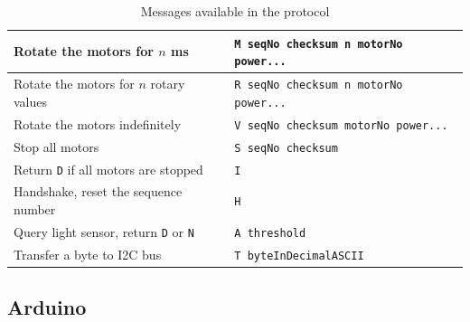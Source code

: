\documentclass[a4paper,12pt]{article}
\begin{document}
\begin{table}[h!]
\centering
\begin{tabular}{ | l | l | }
    \hline
    Rotate the motors for $n$ ms &
    \small{\texttt{M seqNo checksum n motorNo power...}} \\ \hline
    Rotate the motors for $n$ rotary values &
    \small{\texttt{R seqNo checksum n motorNo power...}} \\ \hline
    Rotate the motors indefinitely &
    \small{\texttt{V seqNo checksum motorNo power...}} \\ \hline
    Stop all motors &
    \small{\texttt{S seqNo checksum}} \\ \hline
    Return \texttt{D} if all motors are stopped &
    \small{\texttt{I}} \\ \hline
    Handshake, reset the sequence number &
    \small{\texttt{H}} \\ \hline
    Query light sensor, return \texttt{D} or \texttt{N} &
    \small{\texttt{A threshold}} \\ \hline
    Transfer a byte to I2C bus &
    \small{\texttt{T byteInDecimalASCII}} \\ \hline
\end{tabular}
\caption{Messages available in the protocol}
\label{tab:messages}
\end{table}

\subsection{Arduino}
\end{document}
